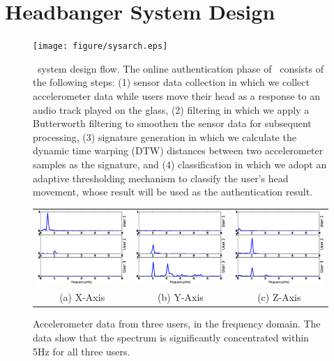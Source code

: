 \section{Headbanger System Design}
\label{sec:design}

\begin{figure}[h]
\centering
\texttt{[image: figure/sysarch.eps]}
\caption{\systemname~system design flow. The online authentication phase of \systemname~consists of the following steps: (1) sensor data collection in which we collect accelerometer data while users move their head as a response to an audio track played on the glass, (2) filtering in which we apply a Butterworth filtering to smoothen the sensor data for subsequent processing, (3) signature generation in which we calculate the dynamic time warping (DTW) distances between two accelerometer samples as the signature, and (4) classification in which we adopt an adaptive thresholding mechanism to classify the user's head movement, whose result will be used as the authentication result.}
\label{fig:sysarch}
\end{figure}

\begin{figure}[t]
\begin{center}
\begin{tabular}{ccc}
\includegraphics [width=.33\linewidth]{figure/freq_x.eps}&
\includegraphics [width=.33\linewidth]{figure/freq_y.eps}&
\includegraphics [width=.33\linewidth]{figure/freq_z.eps}\\
(a) X-Axis & (b) Y-Axis & (c) Z-Axis \\
\end{tabular}
\end{center}
\caption{\label{fig:raw_freq} Accelerometer data from three users, in the frequency
domain. The data show that the spectrum is significantly
concentrated within 5Hz for all three users.}
\end{figure}

